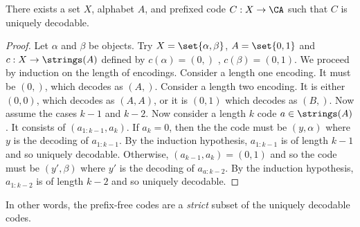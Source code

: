 \begin{proposition}
  There exists a set $X$, alphabet $A$, and prefixed code $C: X \to \CA$ such that $C$ is uniquely decodable.
  \begin{proof}
  Let $\alpha$ and $\beta$ be objects.
    Try $X = \set{\alpha, \beta}$, $A = \set{0, 1}$ and $c: X \to \strings(A)$ defined by $c(\alpha) = (0,)$ , $c(\beta) = (0,1)$.
  We proceed by induction on the length of encodings.
  Consider a length one encoding.
  It must be $(0,)$, which decodes as $(A,)$.
  Consider a length two encoding.
  It is either $(0,0)$, which decodes as $(A,A)$, or it is $(0,1)$ which decodes as $(B,)$.
  Now assume the cases $k-1$ and $k-2$.
  Now consider a length $k$ code $a \in \strings(A)$.
  It consists of $(a_{1:k-1},a_k)$.
  If $a_k = 0$, then the the code must be $(y, \alpha)$ where $y$ is the decoding of $a_{1:k-1}$.
  By the induction hypothesis, $a_{1:k-1}$ is of length $k-1$ and so uniquely decodable.
  Otherwise, $(a_{k-1}, a_k) = (0,1)$ and so the code must be $(y', \beta)$ where $y'$ is the decoding of $a_{a:k-2}$.
  By the induction hypothesis, $a_{1:k-2}$ is of length $k-2$ and so uniquely decodable.
  \end{proof}
\end{proposition}

In other words, the prefix-free codes are a \textit{strict} subset of the uniquely decodable codes.
